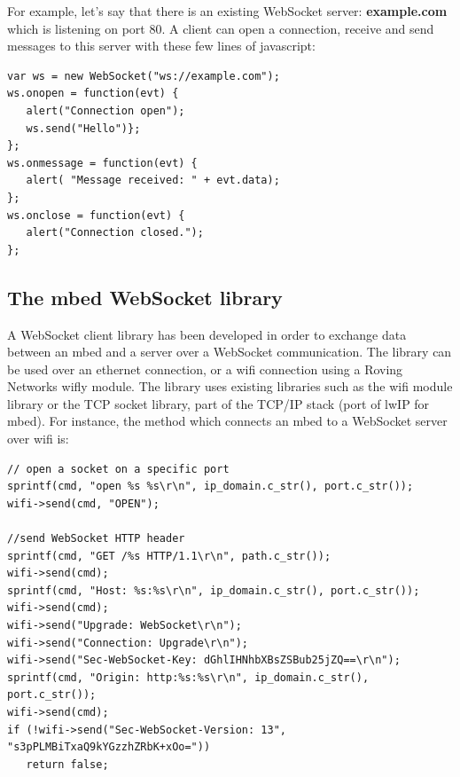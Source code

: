 \documentclass[pdftex,10pt,a4paper]{report}
\begin{document}
For example, let's say that there is an existing WebSocket server: \textbf{example.com} which is listening on port 80. A client can open a connection, receive and send messages to this server with these few lines of javascript:

\begin{center}
\begin{lstlisting}[label=Javascript Websocket Hello World,caption=Javascript Websocket Hello World]
var ws = new WebSocket("ws://example.com");
ws.onopen = function(evt) { 
   alert("Connection open"); 
   ws.send("Hello")}; 
};
ws.onmessage = function(evt) { 
   alert( "Message received: " + evt.data); 
}; 
ws.onclose = function(evt) { 
   alert("Connection closed."); 
};
\end{lstlisting}
\end{center}


\subsection{The mbed WebSocket library}
A WebSocket client library has been developed in order to exchange data between an mbed and a server over a WebSocket communication. The library can be used over an ethernet connection, or a wifi connection using a Roving Networks wifly module. The library uses existing libraries such as the wifi module library or the TCP socket library, part of the TCP/IP stack (port of lwIP for mbed). For instance, the method which connects an mbed to a WebSocket server over wifi is:


\begin{center}
\begin{lstlisting}[label=Connection to a WebSocket server,caption=Connection to a WebSocket server]
// open a socket on a specific port
sprintf(cmd, "open %s %s\r\n", ip_domain.c_str(), port.c_str());
wifi->send(cmd, "OPEN");

//send WebSocket HTTP header
sprintf(cmd, "GET /%s HTTP/1.1\r\n", path.c_str());
wifi->send(cmd);
sprintf(cmd, "Host: %s:%s\r\n", ip_domain.c_str(), port.c_str());
wifi->send(cmd);
wifi->send("Upgrade: WebSocket\r\n");
wifi->send("Connection: Upgrade\r\n");
wifi->send("Sec-WebSocket-Key: dGhlIHNhbXBsZSBub25jZQ==\r\n");
sprintf(cmd, "Origin: http:%s:%s\r\n", ip_domain.c_str(), port.c_str());
wifi->send(cmd);
if (!wifi->send("Sec-WebSocket-Version: 13", "s3pPLMBiTxaQ9kYGzzhZRbK+xOo="))
   return false;

\end{lstlisting}
\end{center}
\end{document}
